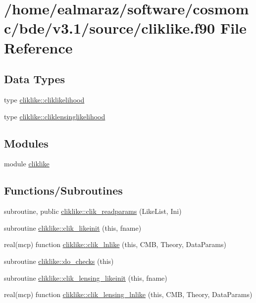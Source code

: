 \hypertarget{cliklike_8f90}{}\section{/home/ealmaraz/software/cosmomc/bde/v3.1/source/cliklike.f90 File Reference}
\label{cliklike_8f90}
\subsection*{Data Types}
\begin{DoxyCompactItemize}
\item 
type \mbox{\hyperlink{structcliklike_1_1cliklikelihood}{cliklike\+::cliklikelihood}}
\item 
type \mbox{\hyperlink{structcliklike_1_1cliklensinglikelihood}{cliklike\+::cliklensinglikelihood}}
\end{DoxyCompactItemize}
\subsection*{Modules}
\begin{DoxyCompactItemize}
\item 
module \mbox{\hyperlink{namespacecliklike}{cliklike}}
\end{DoxyCompactItemize}
\subsection*{Functions/\+Subroutines}
\begin{DoxyCompactItemize}
\item 
subroutine, public \mbox{\hyperlink{namespacecliklike_afd6ed043a70bb783b9840d5569cb85bb}{cliklike\+::clik\+\_\+readparams}} (Like\+List, Ini)
\item 
subroutine \mbox{\hyperlink{namespacecliklike_a093a22f8a8a490ec917ebc7a92c27c2b}{cliklike\+::clik\+\_\+likeinit}} (this, fname)
\item 
real(mcp) function \mbox{\hyperlink{namespacecliklike_a8fa2426732ea59e352d0c0e13011fe62}{cliklike\+::clik\+\_\+lnlike}} (this, C\+MB, Theory, Data\+Params)
\item 
subroutine \mbox{\hyperlink{namespacecliklike_ab304afaa9dfed7a5bfa3d0827bce1b4d}{cliklike\+::do\+\_\+checks}} (this)
\item 
subroutine \mbox{\hyperlink{namespacecliklike_af1724949f007a273de7b121db709494d}{cliklike\+::clik\+\_\+lensing\+\_\+likeinit}} (this, fname)
\item 
real(mcp) function \mbox{\hyperlink{namespacecliklike_ad4622dfac7ccf0cffb96b6b9d1e097d9}{cliklike\+::clik\+\_\+lensing\+\_\+lnlike}} (this, C\+MB, Theory, Data\+Params)
\end{DoxyCompactItemize}

